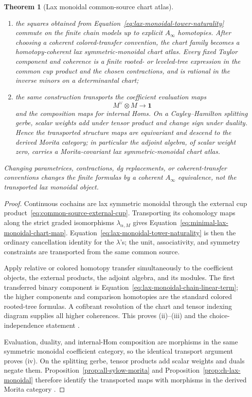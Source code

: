 \documentclass[11pt]{article}
\newtheorem{theorem}{Theorem}[section]
\theoremstyle{definition}
\begin{document}
\begin{theorem}[Lax monoidal common-source chart atlas]
\begin{enumerate}[label=\textnormal{(\roman*)}]
\begin{equation}
\end{equation}
\item the squares obtained from Equation~\eqref{eq:lax-monoidal-tower-naturality} commute on the finite chain models up to explicit $A_\infty$ homotopies.  After choosing a coherent colored-transfer convention, the chart family becomes a homotopy-coherent lax symmetric-monoidal chart atlas.  Every fixed Taylor component and coherence is a finite rooted- or leveled-tree expression in the common cup product and the chosen contractions, and is rational in the inverse minors on a determinantal chart;
\item the same construction transports the coefficient evaluation maps
\[
 M^\vee\otimes M\longrightarrow\mathbf1
\]
and the composition maps for internal Homs.  On a Cayley--Hamilton splitting gerbe, scalar weights add under tensor product and change sign under duality.  Hence the transported structure maps are equivariant and descend to the derived Morita category; in particular the adjoint algebra, of scalar weight zero, carries a Morita-covariant lax symmetric-monoidal chart atlas.
\end{enumerate}
Changing parametrices, contractions, dg replacements, or coherent-transfer conventions changes the finite formulas by a coherent $A_\infty$ equivalence, not the transported lax monoidal object.
\end{theorem}

\begin{proof}
Continuous cochains are lax symmetric monoidal through the external cup product~\eqref{eq:common-source-external-cup}.  Transporting its cohomology maps along the strict graded isomorphisms $\lambda_{\alpha,M}$ gives Equation~\eqref{eq:minimal-lax-monoidal-chart-map}.  Equation~\eqref{eq:lax-monoidal-tower-naturality} is then the ordinary cancellation identity for the $\lambda$'s; the unit, associativity, and symmetry constraints are transported from the same common source.

Apply relative or colored homotopy transfer simultaneously to the coefficient objects, the external products, the adjoint algebra, and its modules.  The first transferred binary component is Equation~\eqref{eq:lax-monoidal-chain-linear-term}; the higher components and comparison homotopies are the standard colored rooted-tree formulas.  A cofibrant resolution of the chart and tensor indexing diagram supplies all higher coherences.  This proves (ii)--(iii) and the choice-independence statement \cite{BurkeTransfer,ManettiPerturbation,VokrinekHPT}.

Evaluation, duality, and internal-Hom composition are morphisms in the same symmetric monoidal coefficient category, so the identical transport argument proves (iv).  On the splitting gerbe, tensor products add scalar weights and duals negate them.  Proposition~\ref{prop:all-sylow-morita} and Proposition~\ref{prop:ch-lax-monoidal} therefore identify the transported maps with morphisms in the derived Morita category \cite{ToenAzumaya}.
\end{proof}
\end{document}
